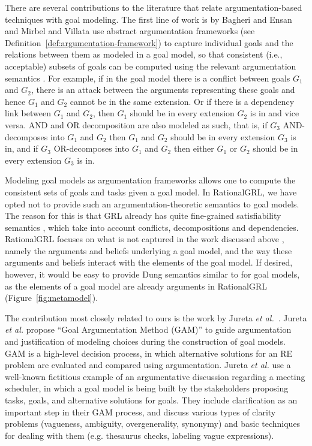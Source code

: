 There are several contributions to the literature that relate argumentation-based techniques with goal modeling. The first line of work is by Bagheri and Ensan \cite{bagheri2011consolidating} and Mirbel and Villata \cite{MirbelVillata12} use abstract argumentation frameworks (see Definition~\ref{def:argumentation-framework}) to capture individual goals and the relations between them as modeled in a goal model, so that consistent (i.e., acceptable) subsets of goals can be computed using the relevant argumentation semantics \cite{Dung1995}. For example, if in the goal model there is a conflict between goals $G_1$ and $G_2$, there is an attack between the arguments representing these goals and hence $G_1$ and $G_2$ cannot be in the same extension. Or if there is a dependency link between $G_1$ and $G_2$, then $G_1$ should be in every extension $G_2$ is in and vice versa. AND and OR decomposition are also modeled as such, that is, if $G_3$ AND-decomposes into $G_1$ and $G_2$ then $G_1$ and $G_2$ should be in every extension $G_3$ is in, and if $G_3$ OR-decomposes into $G_1$ and $G_2$ then either $G_1$ or $G_2$ should be in every extension $G_3$ is in. 

Modeling goal models as argumentation frameworks allows one to compute the consistent sets of goals and tasks given a goal model. In RationalGRL, we have opted not to provide such an argumentation-theoretic semantics to goal models. The reason for this is that GRL already has quite fine-grained satisfiability semantics \cite{Amyot:2010:EGM:1841349.1841356}, which take into account conflicts, decompositions and dependencies. RationalGRL focuses on what is not captured in the work discussed above \cite{bagheri2011consolidating,MirbelVillata12}, namely the arguments and beliefs underlying a goal model, and the way these arguments and beliefs interact with the elements of the goal model. If desired, however, it would be easy to provide Dung semantics similar to \cite{bagheri2011consolidating,MirbelVillata12} for goal models, as the elements of a goal model are already arguments in RationalGRL (Figure~\ref{fig:metamodel}). 

The contribution most closely related to ours is the work by Jureta \emph{et al.}~\cite{Jureta:RE2008}. Jureta \emph{et al.} propose ``Goal Argumentation Method (GAM)'' to guide argumentation and justification of modeling choices during the construction of goal models. GAM is a high-level decision process, in which alternative solutions for an RE problem are evaluated and compared using argumentation. Jureta \emph{et al.} use a well-known fictitious example of an argumentative discussion regarding a meeting scheduler, in which a goal model is being built by the stakeholders proposing tasks, goals, and alternative solutions for goals. They include clarification as an important step in their GAM process, and discuss various types of clarity problems (vagueness, ambiguity, overgenerality, synonymy) and basic techniques for dealing with them (e.g. thesaurus checks, labeling vague expressions). 

